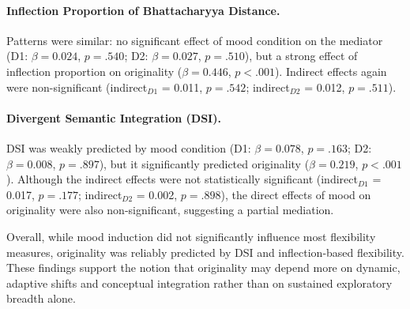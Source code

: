 \documentclass[../MA_Thesis.tex]{subfiles}
\begin{document}
\begin{appendix}
\paragraph{Inflection Proportion of Bhattacharyya Distance.}
Patterns were similar: no significant effect of mood condition on the mediator (D1: $\beta = 0.024$, $p = .540$; D2: $\beta = 0.027$, $p = .510$), but a strong effect of inflection proportion on originality ($\beta = 0.446$, $p < .001$). Indirect effects again were non-significant (indirect$_{D1}$ = 0.011, $p = .542$; indirect$_{D2}$ = 0.012, $p = .511$).

\paragraph{Divergent Semantic Integration (DSI).}
DSI was weakly predicted by mood condition (D1: $\beta = 0.078$, $p = .163$; D2: $\beta = 0.008$, $p = .897$), but it significantly predicted originality ($\beta = 0.219$, $p < .001$). Although the indirect effects were not statistically significant (indirect$_{D1}$ = 0.017, $p = .177$; indirect$_{D2}$ = 0.002, $p = .898$), the direct effects of mood on originality were also non-significant, suggesting a partial mediation.

Overall, while mood induction did not significantly influence most flexibility measures, originality was reliably predicted by DSI and inflection-based flexibility. These findings support the notion that originality may depend more on dynamic, adaptive shifts and conceptual integration rather than on sustained exploratory breadth alone.


\end{appendix}
\end{document}
